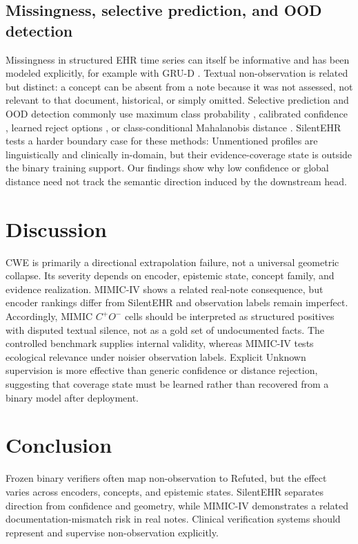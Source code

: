 \documentclass[11pt]{article}
\begin{document}
\subsection{Missingness, selective prediction, and OOD detection}
Missingness in structured EHR time series can itself be informative and has
been modeled explicitly, for example with GRU-D \citep{che-etal-2018-grud}.
Textual non-observation is related but distinct: a concept can be absent from a
note because it was not assessed, not relevant to that document, historical, or
simply omitted. Selective prediction and OOD detection commonly use maximum
class probability \citep{hendrycks-gimpel-2017-baseline}, calibrated confidence
\citep{guo-etal-2017-calibration}, learned reject options
\citep{geifman-el-yaniv-2019-selectivenet}, or class-conditional Mahalanobis
distance \citep{lee-etal-2018-mahalanobis}. SilentEHR tests a harder boundary
case for these methods: Unmentioned profiles are linguistically and clinically
in-domain, but their evidence-coverage state is outside the binary training
support. Our findings show why low confidence or global distance need not track
the semantic direction induced by the downstream head.

\section{Discussion}
CWE is primarily a directional extrapolation failure, not a universal geometric
collapse. Its severity depends on encoder, epistemic state, concept family, and
evidence realization. MIMIC-IV shows a related real-note consequence, but
encoder rankings differ from SilentEHR and observation labels remain imperfect.
Accordingly, MIMIC $C^+O^-$ cells should be interpreted as structured
positives with disputed textual silence, not as a gold set of undocumented
facts. The controlled benchmark supplies internal validity, whereas MIMIC-IV
tests ecological relevance under noisier observation labels. Explicit Unknown
supervision is more effective than generic confidence or distance rejection,
suggesting that coverage state must be learned rather than recovered from a
binary model after deployment.

\section{Conclusion}
Frozen binary verifiers often map non-observation to Refuted, but the effect
varies across encoders, concepts, and epistemic states. SilentEHR separates
direction from confidence and geometry, while MIMIC-IV demonstrates a related
documentation-mismatch risk in real notes. Clinical verification systems should
represent and supervise non-observation explicitly.
\end{document}
